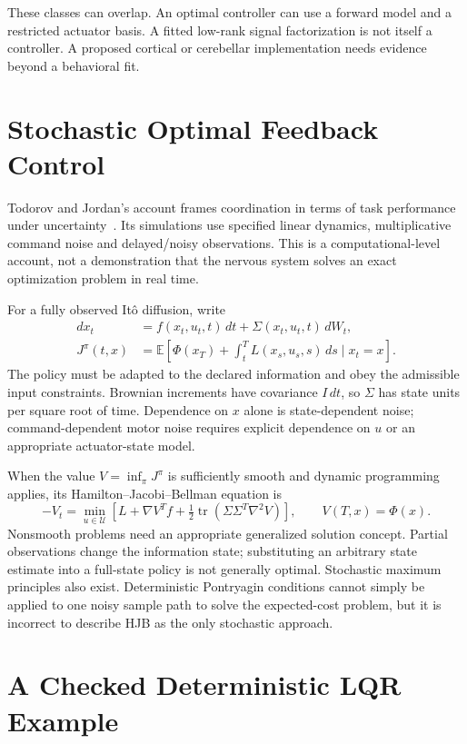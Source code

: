 These classes can overlap. An optimal controller can use a forward model and
a restricted actuator basis. A fitted low-rank signal factorization is not
itself a controller. A proposed cortical or cerebellar implementation needs
evidence beyond a behavioral fit.

\section{Stochastic Optimal Feedback Control}

Todorov and Jordan's account frames coordination in terms of task performance
under uncertainty~\cite{TodorovJordan2002}. Its simulations use specified
linear dynamics, multiplicative command noise and delayed/noisy observations.
This is a computational-level account, not a demonstration that the nervous
system solves an exact optimization problem in real time.

For a fully observed It\^o diffusion, write
\begin{align}
 dx_t&=f(x_t,u_t,t)\,dt+\Sigma(x_t,u_t,t)\,dW_t,\\
 J^\pi(t,x)&=\mathbb E\left[\Phi(x_T)+
       \int_t^T L(x_s,u_s,s)\,ds\mid x_t=x\right].
 \label{eq:ch10:ofc}
\end{align}
The policy must be adapted to the declared information and obey the admissible
input constraints. Brownian increments have covariance $I\,dt$, so
$\Sigma$ has state units per square root of time. Dependence on $x$ alone is
state-dependent noise; command-dependent motor noise requires explicit
dependence on $u$ or an appropriate actuator-state model.

When the value $V=\inf_\pi J^\pi$ is sufficiently smooth and dynamic
programming applies, its Hamilton--Jacobi--Bellman equation is
\begin{equation}
 -V_t=\min_{u\in\mathcal U}\left[
 L+\nabla V^Tf+\tfrac12\operatorname{tr}
       (\Sigma\Sigma^T\nabla^2V)\right],\qquad V(T,x)=\Phi(x).
\end{equation}
Nonsmooth problems need an appropriate generalized solution concept.
Partial observations change the information state; substituting an arbitrary
state estimate into a full-state policy is not generally optimal. Stochastic
maximum principles also exist. Deterministic Pontryagin conditions cannot
simply be applied to one noisy sample path to solve the expected-cost problem,
but it is incorrect to describe HJB as the only stochastic approach.

\section{A Checked Deterministic LQR Example}


